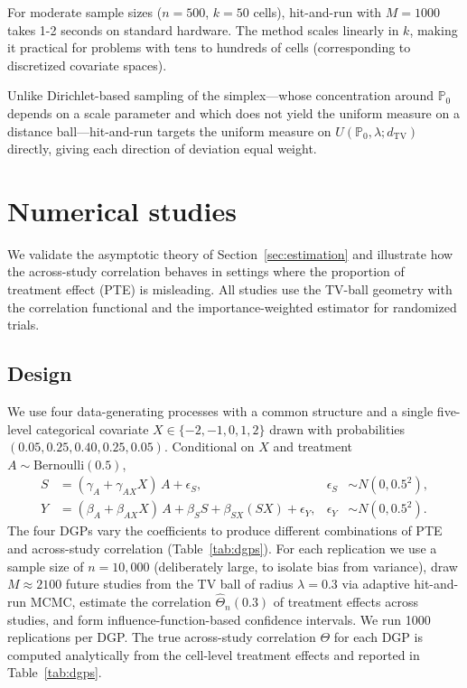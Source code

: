 \documentclass{article}
\newcommand{\PP}{\mathbb{P}}
\begin{document}
For moderate sample sizes ($n = 500$, $k = 50$ cells), hit-and-run with $M = 1000$ takes 1-2 seconds on standard hardware. The method scales linearly in $k$, making it practical for problems with tens to hundreds of cells (corresponding to discretized covariate spaces).

Unlike Dirichlet-based sampling of the simplex---whose concentration around $\PP_0$ depends on a scale parameter and which does not yield the uniform measure on a distance ball---hit-and-run targets the uniform measure on $U(\PP_0, \lambda; d_{\mathrm{TV}})$ directly, giving each direction of deviation equal weight.

\section{Numerical studies}\label{sec:simulation}

We validate the asymptotic theory of Section~\ref{sec:estimation} and illustrate
how the across-study correlation behaves in settings where the proportion of
treatment effect (PTE) is misleading. All studies use the TV-ball geometry with
the correlation functional and the importance-weighted estimator for randomized
trials.

\subsection{Design}\label{sec:sim-design}

We use four data-generating processes with a common structure and a single
five-level categorical covariate $X \in \{-2,-1,0,1,2\}$ drawn with probabilities
$(0.05, 0.25, 0.40, 0.25, 0.05)$. Conditional on $X$ and treatment $A \sim
\mathrm{Bernoulli}(0.5)$,
\begin{align*}
    S &= (\gamma_A + \gamma_{AX} X)\,A + \epsilon_S, & \epsilon_S &\sim N(0, 0.5^2),\\
    Y &= (\beta_A + \beta_{AX} X)\,A + \beta_S S + \beta_{SX} (S X) + \epsilon_Y,
        & \epsilon_Y &\sim N(0, 0.5^2).
\end{align*}
The four DGPs vary the coefficients to produce different combinations of PTE and
across-study correlation (Table~\ref{tab:dgps}). For each replication we use a
sample size of $n = 10{,}000$ (deliberately large, to isolate bias from variance),
draw $M \approx 2100$ future studies from the TV ball of radius $\lambda = 0.3$
via adaptive hit-and-run MCMC, estimate the correlation $\hat{\Theta}_n(0.3)$ of
treatment effects across studies, and form influence-function-based confidence
intervals. We run 1000 replications per DGP. The true across-study correlation
$\Theta$ for each DGP is computed analytically from the cell-level treatment
effects and reported in Table~\ref{tab:dgps}.
\end{document}
